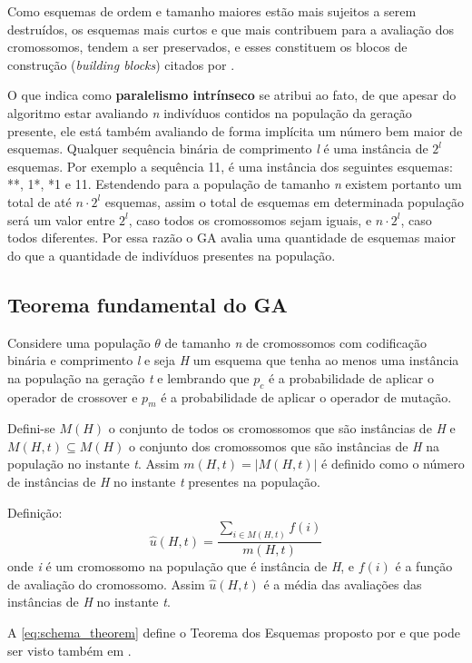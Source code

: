 Como esquemas de ordem e tamanho maiores estão mais sujeitos a serem destruídos, os esquemas mais curtos e que mais contribuem para a avaliação dos cromossomos, tendem a ser preservados, e esses constituem os blocos de construção (\textit{building blocks}) citados por \citeauthor{Goldberg1989}.

O que \citeauthor{Holland1992} indica como \textbf{paralelismo intrínseco} se atribui ao fato, de que apesar do algoritmo estar avaliando \textit{n} indivíduos contidos na população da geração presente, ele está também avaliando de forma implícita um número bem maior de esquemas. Qualquer sequência binária de comprimento \textit{l} é uma instância de \(2^l\) esquemas. Por exemplo a sequência 11, é uma instância dos seguintes esquemas: **, 1*, *1 e 11. Estendendo para a população de tamanho \textit{n} existem portanto um total de até \(n \cdot 2^l\) esquemas, assim o total de esquemas em determinada população será um valor entre \(2^l\), caso todos os cromossomos sejam iguais, e \(n \cdot 2^l\), caso todos diferentes. Por essa razão o GA avalia uma quantidade de esquemas maior do que a quantidade de indivíduos presentes na população.

\subsection{Teorema fundamental do GA}
Considere uma população \(\theta\) de tamanho \textit{n} de cromossomos com codificação binária e comprimento \textit{l} e seja \textit{H} um esquema que tenha ao menos uma instância na população na geração \textit{t} e lembrando que \(p_c\) é a probabilidade de aplicar o operador de crossover e \(p_m\) é a probabilidade de aplicar o operador de mutação.

Defini-se \(M(H)\) o conjunto de todos os cromossomos que são instâncias de \textit{H} e \(M(H, t) \subseteq M(H)\) o conjunto dos cromossomos que são instâncias de \textit{H} na população no instante \textit{t}. Assim \(m(H, t) = |M(H,t)|\) é definido como o número de instâncias de \textit{H} no instante \textit{t} presentes na população. 

Definição: 
\[\hat{u}(H,t) = \frac{\sum\limits_{i \in M(H,t)}f(i)}{m(H,t)}\]
onde \textit{i} é um cromossomo na população que é instância de \textit{H}, e \(f(i)\) é a função de avaliação do cromossomo. Assim \(\hat{u}(H,t)\) é a média das avaliações das instâncias de \textit{H} no instante \textit{t}.

A \autoref{eq:schema_theorem} define o Teorema dos Esquemas proposto por \citeauthor{Holland1992} e que pode ser visto também em .


